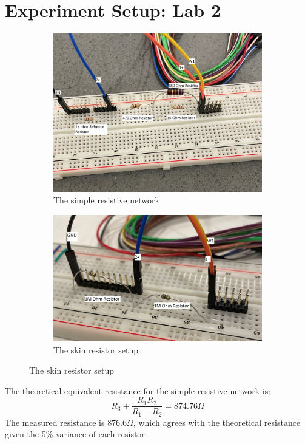 \documentclass[12pt]{article}
\begin{document}
\section*{Experiment Setup: Lab 2}
\begin{figure}[h]
\centering
\begin{subfigure}{.5\textwidth}
  \centering
  \includegraphics[width=.9\linewidth]{EquivalentResistance}
  \caption{The simple resistive network}
\end{subfigure}%
\begin{subfigure}{.5\textwidth}
  \centering
  \includegraphics[width=.9\linewidth]{SkinResistor}
  \caption{The skin resistor setup}
\end{subfigure}
\end{figure}
The theoretical equivalent resistance for the simple resistive network is:
$$R_3+\frac{R_1R_2}{R_1+R_2}=874.76\Omega$$
The measured resistance is $876.6\Omega$, which agrees with the theoretical resistance given the 5\% variance of each resistor.
\end{document}
